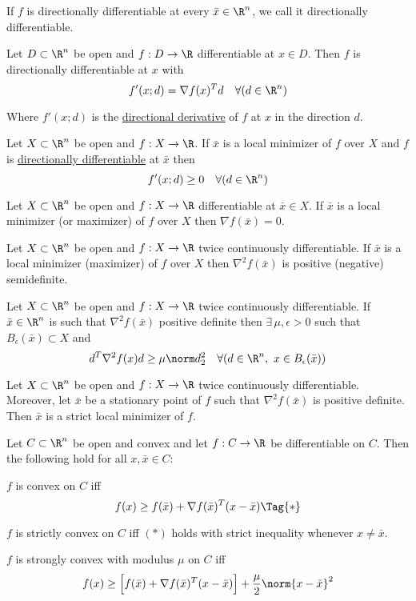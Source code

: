 If $f$ is directionally differentiable at every $\bar x\in\R^n$, we
call it directionally differentiable.

\label{ed67d29}

Let $D\subset \R^n$ be open and $f:D\to\R$
differentiable at $x\in D$. Then $f$ is directionally differentiable
at $x$ with
$$
	f'(x;d)=\nabla f(x)^Td\quad\forall(d\in\R^n)
$$

Where $f'(x;d)$ is the \href{37eb747}{directional derivative} of
$f$ at $x$ in the direction $d$.

\label{b3b5e10}

Let $X\subset\R^n$ be open and $f:X\to\R$. If $\bar x$ is a local
minimizer of $f$ over $X$ and $f$ is \href{37eb747}{directionally
	differentiable} at $\bar x$ then
$$
	f'(x;d)\geq 0\quad\forall(d\in\R^n)
$$

\label{dc165c9}

Let $X\subset\R^n$ be open and $f:X\to\R$ differentiable at $\bar x\in
	X$. If $\bar x$ is a local minimizer (or maximizer) of $f$ over $X$
then $\nabla f(\bar x)=0$.

\label{ce5370d}

Let $X\subset\R^n$ be open and $f:X\to\R$ twice continuously
differentiable. If $\bar x$ is a local minimizer (maximizer) of $f$
over $X$ then $\nabla^2f(\bar x)$ is positive (negative) semidefinite.

\label{eaa0d24}

Let $X\subset\R^n$ be open and $f:X\to\R$ twice continuously
differentiable. If $\bar x\in\R^n$ is such that $\nabla^2f(\bar x)$
positive definite then $\exists\,\mu,\epsilon>0$ such that
$B_\epsilon(\bar x)\subset X$ and
$$
	d^T\nabla^2f(x)d\geq\mu\norm d^2_2\quad\forall(d\in\R^n,\
	x\in B_\epsilon(\bar x))
$$

\label{b43d95d}

Let $X\subset\R^n$ be open and $f:X\to\R$ twice continuously
differentiable. Moreover, let $\bar x$ be a stationary point of $f$
such that $\nabla^2f(\bar x)$ is positive definite. Then $\bar x$ is a
strict local minimizer of $f$.

\label{cd9cea7}

Let $C\subset\R^n$ be open and convex and let $f:C\to\R$ be
differentiable on $C$. Then the following hold for all $x,\bar x\in
	C$:
\begin{enumerata}
	\item $f$ is convex on $C$ iff
	\begin{equation}
		f(x)\geq f(\bar x)+\nabla f(\bar x)^T(x-\bar x)\Tag{*}
	\end{equation}
	\item $f$ is strictly convex on $C$ iff $(*)$ holds with strict
	inequality whenever $x\neq\bar x$.
	\item $f$ is strongly convex with modulus $\mu$ on $C$ iff
	$$
		f(x)\geq\Big[f(\bar x)+\nabla f(\bar x)^T(x-\bar x)\Big]
		+\frac\mu2\norm{x-\bar x}^2
	$$
\end{enumerata}

